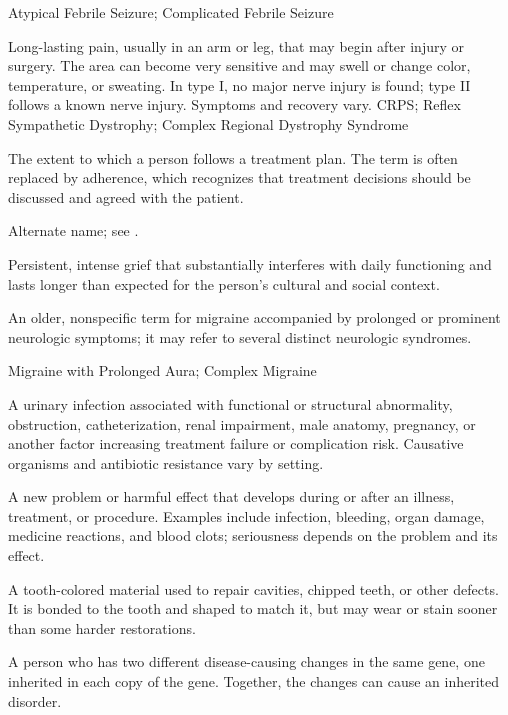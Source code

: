 \synonyms
Atypical Febrile Seizure; Complicated Febrile Seizure

 Long-lasting pain, usually in an arm or leg, that may begin after injury or surgery. The area can become very sensitive and may swell or change color, temperature, or sweating. In type I, no major nerve injury is found; type II follows a known nerve injury. Symptoms and recovery vary.
\synonyms
CRPS; Reflex Sympathetic Dystrophy; Complex Regional Dystrophy Syndrome


 The extent to which a person follows a treatment plan. The term is often replaced by adherence, which recognizes that treatment decisions should be discussed and agreed with the patient.

 Alternate name; see .

 Persistent, intense grief that substantially interferes with daily functioning and lasts longer than expected for the person's
cultural and social context.

 An older, nonspecific term for migraine accompanied by prolonged or prominent neurologic symptoms; it may refer to several distinct neurologic syndromes.

\synonyms
Migraine with Prolonged Aura; Complex Migraine

 A urinary infection associated with functional or structural abnormality, obstruction,
catheterization, renal impairment, male anatomy, pregnancy, or another factor increasing
treatment failure or complication risk. Causative organisms and antibiotic resistance vary by setting.

 A new problem or harmful effect that develops during or after an illness, treatment, or procedure. Examples include infection, bleeding, organ damage, medicine reactions, and blood clots; seriousness depends on the problem and its effect.

 A tooth-colored material used to repair cavities, chipped teeth, or other defects. It is bonded to the tooth and shaped to match it, but may wear or stain sooner than some harder restorations.

 A person who has two different disease-causing changes in the same gene, one inherited in each copy of the gene. Together, the changes can cause an inherited disorder.


